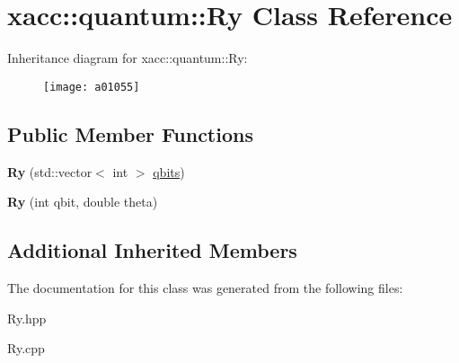 \hypertarget{a01055}{}\section{xacc\+:\+:quantum\+:\+:Ry Class Reference}
\label{a01055}
Inheritance diagram for xacc\+:\+:quantum\+:\+:Ry\+:\begin{figure}[H]
\begin{center}
\leavevmode
\texttt{[image: a01055]}
\end{center}
\end{figure}
\subsection*{Public Member Functions}
\begin{DoxyCompactItemize}
\item 
\mbox{\label{a01055_a542e1c0576a8e784f6cece4c77598486}} 
{\bfseries Ry} (std\+::vector$<$ int $>$ \hyperlink{a01015_a2a56be6c2519ea65df4d06f4abae1393}{qbits})
\item 
\mbox{\label{a01055_a1cb81fe622168ba8d79fa2a78b5b0006}} 
{\bfseries Ry} (int qbit, double theta)
\end{DoxyCompactItemize}
\subsection*{Additional Inherited Members}


The documentation for this class was generated from the following files\+:\begin{DoxyCompactItemize}
\item 
Ry.\+hpp\item 
Ry.\+cpp\end{DoxyCompactItemize}
